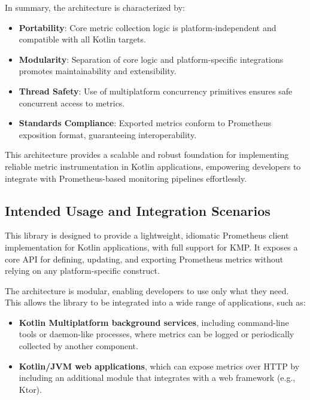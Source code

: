 In summary, the architecture is characterized by:

\begin{itemize}
    \item \textbf{Portability}: Core metric collection logic is platform-independent and compatible with all Kotlin targets.
    \item \textbf{Modularity}: Separation of core logic and platform-specific integrations promotes maintainability and extensibility.
    \item \textbf{Thread Safety}: Use of multiplatform concurrency primitives ensures safe concurrent access to metrics.
    \item \textbf{Standards Compliance}: Exported metrics conform to Prometheus exposition format, guaranteeing interoperability.
\end{itemize}

This architecture provides a scalable and robust foundation for implementing reliable metric instrumentation in Kotlin applications, empowering developers to integrate with Prometheus-based monitoring pipelines effortlessly.

\subsection{Intended Usage and Integration Scenarios}\label{subsec:intended-usage-and-integration-scenarios}

This library is designed to provide a lightweight, idiomatic Prometheus client implementation for Kotlin
applications, with full support for \ac{KMP}.
It exposes a core \ac{API} for defining, updating, and exporting Prometheus metrics without relying on any platform-specific construct.

The architecture is modular, enabling developers to use only what they need.
This allows the library to be integrated into a wide range of
applications, such as:

\begin{itemize}
    \item \textbf{Kotlin Multiplatform background services}, including command-line tools or daemon-like processes, where metrics can be logged or periodically collected by another component.
    \item \textbf{Kotlin/JVM web applications}, which can expose metrics over HTTP by including an additional module that integrates with a web framework (e.g., Ktor).
\end{itemize}

